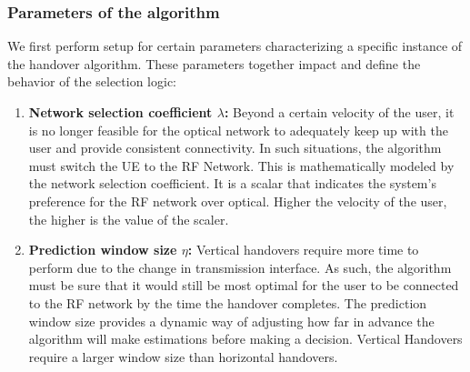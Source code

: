 \subsubsection{Parameters of the algorithm}
\label{subsubsec:param_init}
We first perform setup for certain parameters characterizing a specific instance of the handover algorithm. These parameters together impact and define the behavior of the selection logic:
\begin{enumerate}
    \item \textbf{Network selection coefficient $\lambda$:} Beyond a certain velocity of the user, it is no longer feasible for the optical network to adequately keep up with the user and provide consistent connectivity. In such situations, the algorithm must switch the UE to the RF Network. This is mathematically modeled by the network selection coefficient. It is a scalar that indicates the system's preference for the RF network over optical. Higher the velocity of the user, the higher is the value of the scaler.
    \item \textbf{Prediction window size $\eta$:} Vertical handovers require more time to perform due to the change in transmission interface. As such, the algorithm must be sure that it would still be most optimal for the user to be connected to the RF network by the time the handover completes. The prediction window size provides a dynamic way of adjusting how far in advance the algorithm will make estimations before making a decision. Vertical Handovers require a larger window size than horizontal handovers. 
\end{enumerate}
